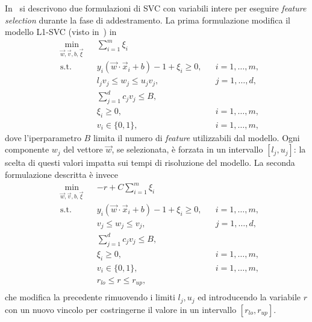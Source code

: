 In~\cite{2014_MIP_feature_selection} si descrivono due formulazioni di SVC  con variabili intere per eseguire \emph{feature selection} durante la fase di addestramento.
La prima formulazione modifica il modello L1-SVC (visto in~) in 
\begin{equation*}
\begin{aligned}
& \min_{\Vec{w}, \Vec{v}, b, \Vec{\xi}}    && \sum_{i=1}^{m} \xi_i \\
& \textrm{s.t.} && y_i(\Vec{w}\cdot \Vec{x}_i + b) - 1 + \xi_i \geq 0,   && i=1,\dots,m, \\
&               && l_jv_j \leq w_j \leq u_jv_j,                          && j=1,\dots,d, \\
&               && \sum_{j=1}^{d} c_jv_j \leq B,                                        \\
&               && \xi_i \geq 0,                                         && i=1,\dots,m, \\
&               && v_i \in \{0,1\},                                      && i=1,\dots,m, 
\end{aligned}
\end{equation*}
dove l'iperparametro $B$ limita il numero di \emph{feature} utilizzabili dal modello.
Ogni componente $w_j$ del vettore $\Vec{w}$, se selezionata, è forzata in un intervallo $[l_j,u_j]$: la scelta di questi valori impatta sui tempi di risoluzione del modello.
La seconda formulazione descritta è invece
\begin{equation*}
\begin{aligned}
& \min_{\Vec{w}, \Vec{v}, b, \Vec{\xi}}    && -r + C\sum_{i=1}^{m} \xi_i \\
& \textrm{s.t.} && y_i(\Vec{w}\cdot \Vec{x}_i + b) - 1 + \xi_i \geq 0,   && i=1,\dots,m, \\
&               && v_j \leq w_j \leq v_j,                                && j=1,\dots,d, \\
&               && \sum_{j=1}^{d} c_jv_j \leq B,                                        \\
&               && \xi_i \geq 0,                                         && i=1,\dots,m, \\
&               && v_i \in \{0,1\},                                      && i=1,\dots,m, \\
&               && r_{lo} \leq r \leq r_{up}, \\
\end{aligned}
\end{equation*}
che modifica la precedente rimuovendo i limiti $l_j,u_j$ ed introducendo la variabile $r$ con un nuovo vincolo per costringerne il valore in un intervallo $[r_{lo}, r_{up}]$.

